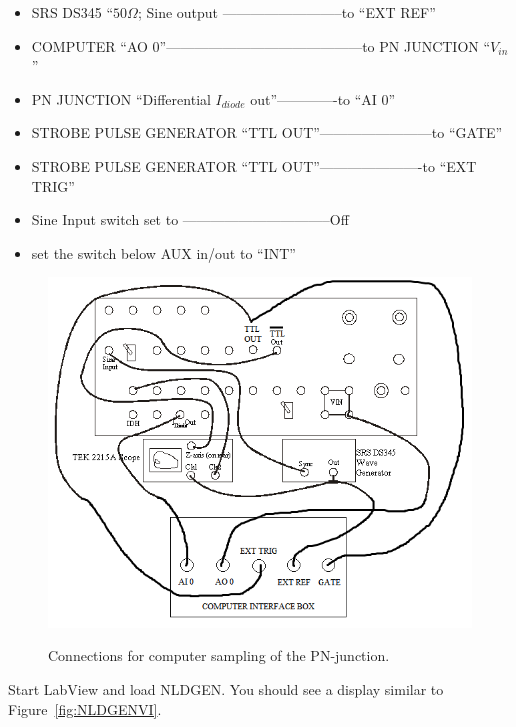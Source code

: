 \documentclass{../lab}
\begin{document}
\begin{itemize}
    \item SRS DS345 ``$ 50 \Omega $; Sine output --------------------------to ``EXT REF''

    \item COMPUTER ``AO 0''------------------------------------------to PN JUNCTION ``$V_{in}$''

    \item PN JUNCTION ``Differential $I_{diode}$ out''-------------to ``AI 0''

    \item STROBE PULSE GENERATOR ``TTL OUT''------------------------to ``GATE''

    \item STROBE PULSE GENERATOR ``TTL OUT''----------------------to ``EXT TRIG''

    \item Sine Input switch set to --------------------------------Off

    \item set the switch below AUX in/out to ``INT''
\end{itemize}

\begin{figure}[h]
    \centering
    \href{http://experimentationlab.berkeley.edu/sites/default/files/images/NLD_PN_DIAGRAM.png}{\includegraphics[width=0.7\linewidth]{images/NLD_PN_DIAGRAM.png}}
    \caption{Connections for computer sampling of the PN-junction.}
    \label{fig:ConnectionsForComputerSamplingOfPNJunction}
\end{figure}

Start LabView and load NLDGEN. You should see a display similar to Figure~\ref{fig:NLDGENVI}.
\end{document}

